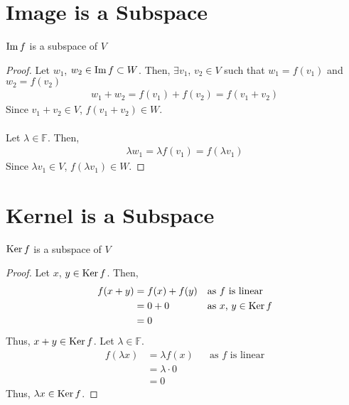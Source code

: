 \documentclass[letterpaper,12pt]{article}
\begin{document}
\section*{Image is a Subspace}
\begin{theorem}
$\operatorname{Im}{f}$ is a subspace of $V$
\end{theorem}
\begin{proof}
Let $w_1$, $w_2 \in \operatorname{Im}{f} \subset W$. Then, $\exists v_1$, $v_2 \in V$ such that $w_1 = f(v_1)$ and $w_2 = f(v_2)$
\begin{align*}
    w_1 + w_2 = f(v_1) + f(v_2) = f(v_1 + v_2)
\end{align*}
Since $v_1 + v_2 \in V$, $f(v_1 + v_2) \in W$.
\\ \\ Let $\lambda \in \mathbb{F}$. Then,
\begin{align*}
    \lambda w_1 = \lambda f(v_1) = f(\lambda v_1)
\end{align*}
Since $\lambda v_1 \in V$, $f(\lambda v_1) \in W$.
\end{proof}

\section*{Kernel is a Subspace}
\begin{theorem}
$\operatorname{Ker}{f}$ is a subspace of $V$
\end{theorem}
\begin{proof}
Let $x$, $y \in \operatorname{Ker}{f}$. Then,
\begin{align*}
    f(x + y) & = f(x) + f(y) && \text{as $f$ is linear} \\
    & = 0 + 0 && \text{as $x$, $y \in \operatorname{Ker}{f}$} \\
    & = 0
\end{align*}
Thus, $x + y \in \operatorname{Ker}{f}$. Let $\lambda \in \mathbb{F}$.
\begin{align*}
    f(\lambda x) & = \lambda f(x) && \text{as $f$ is linear} \\
    & = \lambda \cdot 0 \\
    & = 0
\end{align*}
Thus, $\lambda x \in \operatorname{Ker}{f}$.
\end{proof}
\end{document}
